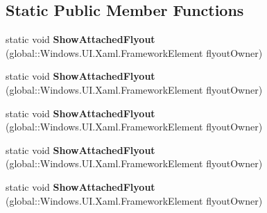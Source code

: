 \subsection*{Static Public Member Functions}
\begin{DoxyCompactItemize}
\item 
\mbox{\label{class_windows_1_1_u_i_1_1_xaml_1_1_controls_1_1_primitives_1_1_flyout_base_a2a0c8aadad36396477b0ec54ff2ff688}} 
static void {\bfseries Show\+Attached\+Flyout} (global\+::\+Windows.\+U\+I.\+Xaml.\+Framework\+Element flyout\+Owner)
\item 
\mbox{\label{class_windows_1_1_u_i_1_1_xaml_1_1_controls_1_1_primitives_1_1_flyout_base_a2a0c8aadad36396477b0ec54ff2ff688}} 
static void {\bfseries Show\+Attached\+Flyout} (global\+::\+Windows.\+U\+I.\+Xaml.\+Framework\+Element flyout\+Owner)
\item 
\mbox{\label{class_windows_1_1_u_i_1_1_xaml_1_1_controls_1_1_primitives_1_1_flyout_base_a2a0c8aadad36396477b0ec54ff2ff688}} 
static void {\bfseries Show\+Attached\+Flyout} (global\+::\+Windows.\+U\+I.\+Xaml.\+Framework\+Element flyout\+Owner)
\item 
\mbox{\label{class_windows_1_1_u_i_1_1_xaml_1_1_controls_1_1_primitives_1_1_flyout_base_a2a0c8aadad36396477b0ec54ff2ff688}} 
static void {\bfseries Show\+Attached\+Flyout} (global\+::\+Windows.\+U\+I.\+Xaml.\+Framework\+Element flyout\+Owner)
\item 
\mbox{\label{class_windows_1_1_u_i_1_1_xaml_1_1_controls_1_1_primitives_1_1_flyout_base_a2a0c8aadad36396477b0ec54ff2ff688}} 
static void {\bfseries Show\+Attached\+Flyout} (global\+::\+Windows.\+U\+I.\+Xaml.\+Framework\+Element flyout\+Owner)
\end{DoxyCompactItemize}
